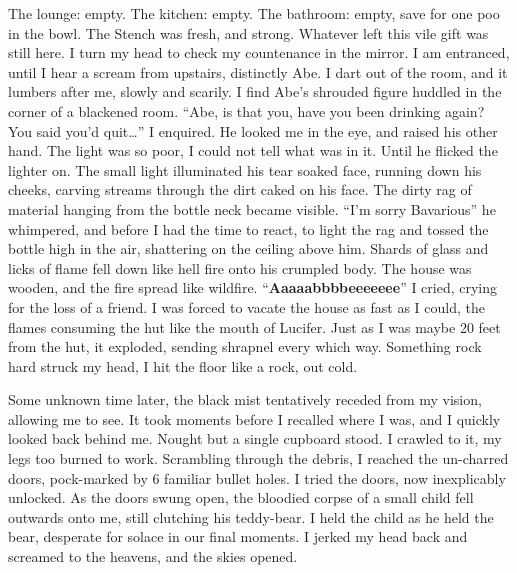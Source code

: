 The lounge: empty. The kitchen: empty. The bathroom: empty, save
for one poo in the bowl. The Stench was fresh, and strong. Whatever
left this vile gift was still here. I turn my head to check my
countenance in the mirror. I am entranced, until I hear a scream
from upstairs, distinctly Abe. I dart out of the room, and it
lumbers after me, slowly and scarily. I find Abe's shrouded
figure huddled in the corner of a blackened room. ``Abe, is
that you, have you been drinking again? You said you'd
quit{\ldots}'' I enquired. He looked me in the eye, and raised his
other hand. The light was so poor, I could not tell what was in it.
Until he flicked the lighter on. The small light illuminated his
tear soaked face, running down his cheeks, carving streams through
the dirt caked on his face. The dirty rag of material hanging from
the bottle neck became visible. ``I'm sorry
Bavarious'' he whimpered, and before I had the time to react,
to light the rag and tossed the bottle high in the air, shattering
on the ceiling above him. Shards of glass and licks of flame fell
down like hell fire onto his crumpled body. The house was wooden,
and the fire spread like wildfire. ``{\bf Aaaaabbbbeeeeeee}'' I
cried, crying for the loss of a friend. I was forced to vacate the
house as fast as I could, the flames consuming the hut like the
mouth of Lucifer. Just as I was maybe 20 feet from the hut, it
exploded, sending shrapnel every which way. Something rock hard
struck my head, I hit the floor like a rock, out cold.



Some unknown time later, the black mist tentatively receded from my
vision, allowing me to see. It took moments before I recalled where
I was, and I quickly looked back behind me. Nought but a single
cupboard stood. I crawled to it, my legs too burned to work.
Scrambling through the debris, I reached the un-charred doors,
pock-marked by 6 familiar bullet holes. I tried the doors, now
inexplicably unlocked. As the doors swung open, the bloodied corpse
of a small child fell outwards onto me, still clutching his
teddy-bear. I held the child as he held the bear, desperate for
solace in our final moments. I jerked my head back and screamed to
the heavens, and the skies opened. 
 




